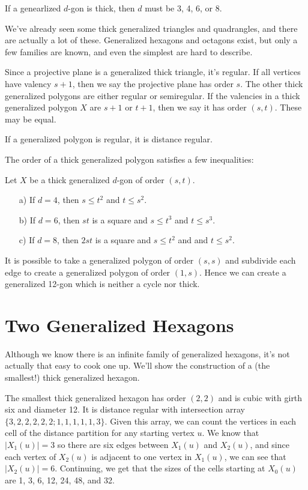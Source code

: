 \begin{theorem}
	If a genearlized $d$-gon is thick, then $d$ must be 3, 4, 6, or 8.
\end{theorem}

We've already seen some thick generalized triangles and quadrangles, and there are actually a lot of these.  Generalized hexagons and octagons exist, but only a few families are known, and even the simplest are hard to describe.

Since a projective plane is a generalized thick triangle, it's regular.  If all vertices have valency $s+1$, then we say the projective plane has order $s$.  The other thick generalized polygons are either regular or semiregular.  If the valencies in a thick generalized polygon $X$ are $s+1$ or $t+1$, then we say it has order $(s,t)$.  These may be equal.

\begin{lemma}
	If a generalized polygon is regular, it is distance regular.
\end{lemma}

The order of a thick generalized polygon satisfies a few inequalities:

\begin{theorem}
	Let $X$ be a thick generalized $d$-gon of order $(s,t)$.
	
	\begin{enumerate}
		\item[a)] If $d=4$, then $s\leq t^2$ and $t\leq s^2$.
		\item[b)] If $d=6$, then $st$ is a square and $s\leq t^3$ and $t\leq s^3$.
		\item[c)] If $d=8$, then $2st$ is a square and $s\leq t^2$ and and $t\leq s^2$. 
	\end{enumerate}
\end{theorem}
It is possible to take a generalized polygon of order $(s,s)$ and subdivide each edge to create a generalized polygon of order $(1,s)$.  Hence we can create a generalized 12-gon which is neither a cycle nor thick.

\section*{Two Generalized Hexagons}
Although we know there is an infinite family of generalized hexagons, it's not actually that easy to cook one up.  We'll show the construction of a (the smallest!) thick generalized hexagon.

The smallest thick generalized hexagon has order $(2,2)$ and is cubic with girth six and diameter 12.  It is distance regular with intersection array $\{3,2,2,2,2,2;1,1,1,1,1,3\}$.  Given this array, we can count the vertices in each cell of the distance partition for any starting vertex $u$.  We know that $|X_1(u)|=3$ so there are six edges between $X_1(u)$ and $X_2(u)$, and since each vertex of $X_2(u)$ is adjacent to one vertex in $X_1(u)$, we can see that $|X_2(u)|=6$.  Continuing, we get that the sizes of the cells starting at $X_0(u)$ are 1, 3, 6, 12, 24, 48, and 32.

